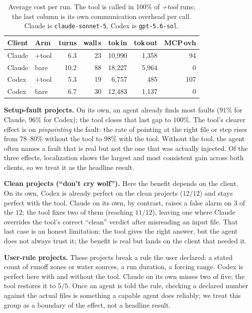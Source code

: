 \documentclass[conference]{IEEEtran}
\begin{document}
\begin{table}[!t]
\caption{Average cost per run. The tool is called in 100\% of \emph{+tool} runs; the last column
is its own communication overhead per call.
Claude is \texttt{claude-sonnet-5}, Codex is \texttt{gpt-5.6-sol}.}
\label{tab:efficiency}
\centering
\footnotesize
\begin{tabular}{@{}ll rrrr r@{}}
\toprule
Client & Arm & turns & wall\,s & tok\,in & tok\,out & MCP\,ovh \\
\midrule
Claude & $+$tool & 6.3  & 23 & 10{,}990 & 1{,}358 & 94  \\
Claude & bare    & 10.2 & 88 & 18{,}227 & 5{,}964 & 0   \\
Codex  & $+$tool & 5.3  & 19 & 6{,}757  & 485     & 107 \\
Codex  & bare    & 6.7  & 30 & 12{,}483 & 1{,}137 & 0   \\
\bottomrule
\end{tabular}
\end{table}

\noindent\textbf{Setup-fault projects.} On its own, an agent already finds most faults ($91\%$ for
Claude, $96\%$ for Codex); the tool closes that last gap to $100\%$. The tool's clearer effect is on \emph{pinpointing} the fault: the rate of
pointing at the right file or step rises from $78$--$80\%$ without the tool to $98\%$ with the
tool. Without the tool, the agent often names a fault that is real but not the one that was
actually injected. Of the three effects, localization shows the largest and most consistent
gain across both clients, so we treat it as the headline result.

\noindent\textbf{Clean projects (``don't cry wolf'').} Here the benefit depends on the client. On
its own, Codex is already perfect on the clean projects ($12/12$) and stays perfect with the
tool. Claude on its own, by contrast, raises a false alarm on $3$ of the $12$; the tool fixes two of them
(reaching $11/12$), leaving one where Claude overrides the tool's correct ``clean'' verdict after
misreading an input file. That last case is an honest limitation: the tool gives the right
answer, but the agent does not always trust it; the benefit is real but lands on the client
that needed it.

\noindent\textbf{User-rule projects.} These projects break a rule the user declared: a stated
count of runoff zones or water sources, a run duration, a forcing range. Codex is perfect
here with and without the tool. Claude on its own misses two of five; the tool restores it to $5/5$. Once an
agent is told the rule, checking a declared number against the actual files is something a
capable agent does reliably; we treat this group as a boundary of the effect, not a headline
result.
\end{document}
